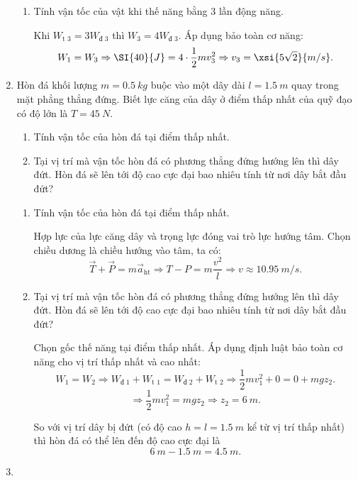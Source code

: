 \begin{enumerate}[label=\bfseries Câu \arabic*:]
{\begin{enumerate}[label=\alph*)]
			\item Tính vận tốc của vật khi thế năng bằng 3 lần động năng.
			
			Khi $W_\text{t 3} = 3 W_\text{đ 3}$ thì $W_3 = 4 W_\text{đ 3}$. Áp dụng bảo toàn cơ năng:
			$$W_1 = W_3 \Rightarrow \SI{40}{J} = 4 \cdot  \dfrac{1}{2}mv_3^2 \Rightarrow v_3 = \xsi{5\sqrt 2}{m/s}.$$
		\end{enumerate}
	}
	\item {}
	
	
	{
		Hòn đá khối lượng $m=\SI{0.5}{kg}$ buộc vào một dây dài $l=\SI{1.5}{m}$ quay trong mặt phẳng thẳng đứng. Biết lực căng của dây ở điểm thấp nhất của quỹ đạo có độ lớn là $T=\SI{45}{N}$.
		\begin{enumerate}[label=\alph*)]
			\item Tính vận tốc của hòn đá tại điểm thấp nhất.
			\item Tại vị trí mà vận tốc hòn đá có phương thẳng đứng hướng lên thì dây đứt. Hòn đá sẽ lên tới độ cao cực đại bao nhiêu tính từ nơi dây bắt đầu đứt?
		\end{enumerate}
	}
	
	\hideall
	{	
			\begin{enumerate}[label=\alph*)]
			\item Tính vận tốc của hòn đá tại điểm thấp nhất.
			
			Hợp lực của lực căng dây và trọng lực đóng vai trò lực hướng tâm. Chọn chiều dương là chiều hướng vào tâm, ta có:
			$$\vec T + \vec P = m\vec a_\text{ht} \Rightarrow T - P = m\dfrac{v^2}{l} \Rightarrow v \approx \SI{10.95}{m/s}.$$
			\item Tại vị trí mà vận tốc hòn đá có phương thẳng đứng hướng lên thì dây đứt. Hòn đá sẽ lên tới độ cao cực đại bao nhiêu tính từ nơi dây bắt đầu đứt?
			
			Chọn gốc thế năng tại điểm thấp nhất. Áp dụng định luật bảo toàn cơ năng cho vị trí thấp nhất và cao nhất:
			$$W_1 = W_2 \Rightarrow W_\text{đ 1} + W_\text{t 1} = W_\text{đ 2} + W_\text{t 2} \Rightarrow \dfrac{1}{2}mv_1^2 + 0 = 0 + mgz_2.$$
			$$\Rightarrow \dfrac{1}{2}mv_1^2 = mgz_2 \Rightarrow z_2 = \SI{6}{m}.$$
			
			So với vị trí dây bị đứt (có độ cao $h=l=\SI{1.5}{m}$ kể từ vị trí thấp nhất) thì hòn đá có thể lên đến độ cao cực đại là $$\SI{6}{m}-\SI{1.5}{m} = \SI{4.5}{m}.$$
		\end{enumerate}
	}
	\item {}
	

\end{enumerate}
